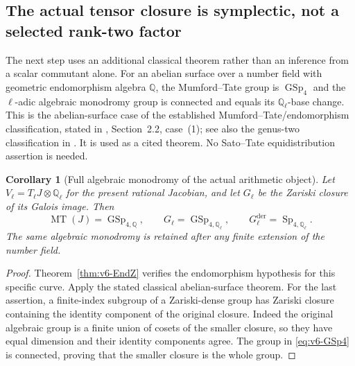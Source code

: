 \documentclass[11pt]{article}
\newtheorem{corollary}[corollary]{Corollary}
\theoremstyle{definition}
\theoremstyle{remark}
\newcommand{\Q}{\mathbb Q}
\begin{document}
\subsection{The actual tensor closure is symplectic, not a selected rank-two factor}
The next step uses an additional classical theorem rather than an inference
from a scalar commutant alone. For an abelian surface over a number field
with geometric endomorphism algebra $\Q$, the Mumford--Tate group is
$\operatorname{GSp}_4$ and the $\ell$-adic algebraic monodromy group is
connected and equals its $\Q_\ell$-base change. This is the abelian-surface
case of the established Mumford--Tate/endomorphism classification, stated
in \cite{LombardoEnd}, Section~2.2, case~(1); see also the genus-two
classification in \cite{FKRS}. It is used as a cited theorem. No
Sato--Tate equidistribution assertion is needed.

\begin{corollary}[Full algebraic monodromy of the actual arithmetic object]
\label{cor:v6-GSp4}
Let $V_\ell=T_\ell J\otimes\Q_\ell$ for the present rational Jacobian,
and let $G_\ell$ be the Zariski closure of its Galois image. Then
\begin{equation}
 \boxed{
 \operatorname{MT}(J)=\operatorname{GSp}_{4,\Q},\qquad
 G_\ell=\operatorname{GSp}_{4,\Q_\ell},\qquad
 G_\ell^{\mathrm{der}}=\operatorname{Sp}_{4,\Q_\ell}.}
 \label{eq:v6-GSp4}
\end{equation}
The same algebraic monodromy is retained after any finite extension of
the number field.
\end{corollary}
\begin{proof}
Theorem~\ref{thm:v6-EndZ} verifies the endomorphism hypothesis for this
specific curve. Apply the stated classical abelian-surface theorem.
For the last assertion, a finite-index subgroup of a Zariski-dense group
has Zariski closure containing the identity component of the original
closure. Indeed the original algebraic group is a finite union of cosets
of the smaller closure, so they have equal dimension and their identity
components agree. The group in \eqref{eq:v6-GSp4} is connected, proving
that the smaller closure is the whole group.
\end{proof}
\end{document}
